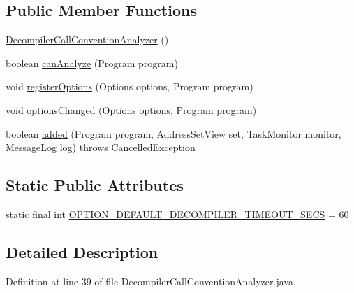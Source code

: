 \subsection*{Public Member Functions}
\begin{DoxyCompactItemize}
\item 
\mbox{\hyperlink{classghidra_1_1app_1_1plugin_1_1core_1_1analysis_1_1_decompiler_call_convention_analyzer_a6b663dc9c4788e0f1dbd3bf617b28966}{Decompiler\+Call\+Convention\+Analyzer}} ()
\item 
boolean \mbox{\hyperlink{classghidra_1_1app_1_1plugin_1_1core_1_1analysis_1_1_decompiler_call_convention_analyzer_acc779d31c624fab55993f1d8fd4cff87}{can\+Analyze}} (Program program)
\item 
void \mbox{\hyperlink{classghidra_1_1app_1_1plugin_1_1core_1_1analysis_1_1_decompiler_call_convention_analyzer_a3979672c970a9f623b6588c219dc6fb0}{register\+Options}} (Options options, Program program)
\item 
void \mbox{\hyperlink{classghidra_1_1app_1_1plugin_1_1core_1_1analysis_1_1_decompiler_call_convention_analyzer_ad4c8fb8c2c9c9c79d4b26f49c41a4d71}{options\+Changed}} (Options options, Program program)
\item 
boolean \mbox{\hyperlink{classghidra_1_1app_1_1plugin_1_1core_1_1analysis_1_1_decompiler_call_convention_analyzer_a4bf219ec2e48c62e6ea46a7ac7c4aa55}{added}} (Program program, Address\+Set\+View set, Task\+Monitor monitor, Message\+Log log)  throws Cancelled\+Exception 
\end{DoxyCompactItemize}
\subsection*{Static Public Attributes}
\begin{DoxyCompactItemize}
\item 
static final int \mbox{\hyperlink{classghidra_1_1app_1_1plugin_1_1core_1_1analysis_1_1_decompiler_call_convention_analyzer_ad8022ff4799c178f518e249d6f7cdbdc}{O\+P\+T\+I\+O\+N\+\_\+\+D\+E\+F\+A\+U\+L\+T\+\_\+\+D\+E\+C\+O\+M\+P\+I\+L\+E\+R\+\_\+\+T\+I\+M\+E\+O\+U\+T\+\_\+\+S\+E\+CS}} = 60
\end{DoxyCompactItemize}


\subsection{Detailed Description}


Definition at line 39 of file Decompiler\+Call\+Convention\+Analyzer.\+java.



